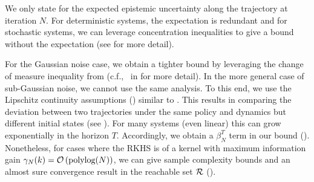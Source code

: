 We only state  for the expected epistemic uncertainty along the trajectory at iteration $N$. For deterministic systems, the expectation is redundant and for stochastic systems, we can leverage concentration inequalities to give a bound without the expectation (see  for more detail).

For the Gaussian noise case, we obtain a tighter bound by leveraging the change of measure inequality from \citet[Lemma~C.2.]{kakade2020information} (c.f.,~ in  for more detail). In the more general case of sub-Gaussian noise, we cannot use the same analysis. To this end, we use the Lipschitz continuity assumptions () similar to \citet{curi2020efficient}. This results in comparing the deviation between two trajectories under the same policy and dynamics but different initial states (see ). For many systems (even linear) this can grow exponentially in the horizon $T$. Accordingly, we obtain a $\beta^T_N$ term in our bound (). Nonetheless, for cases where the RKHS is of a kernel with maximum information gain  $\gamma_N(k) 
= {\mathcal{O}}\left(\text{polylog}(N)\right)$, we can give sample complexity bounds and an almost sure convergence result in the reachable set ${\mathcal{R}}$ ().
